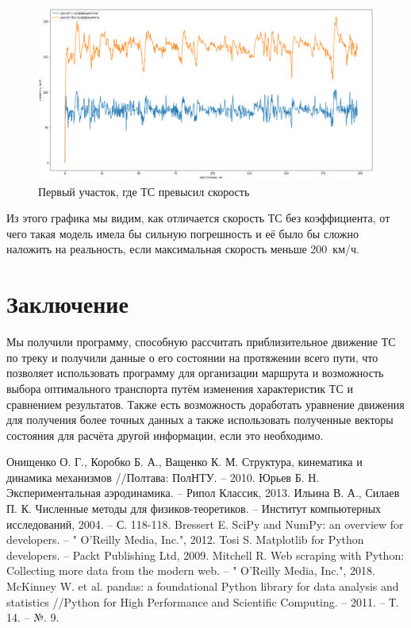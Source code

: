 \documentclass[A4paper,12pt]{article}
\theoremstyle{plain} %
\theoremstyle{definition} %
\theoremstyle{remark} %
\begin{document}
  \begin{figure}[h!]
     \centering
     \includegraphics[scale = 0.55]{Сравнение_скорости.png}
     \caption{Первый участок, где ТС превысил скорость}
 \end{figure}
 
 Из этого графика мы видим, как отличается скорость ТС без коэффициента, от чего такая модель имела бы сильную погрешность и её было бы сложно наложить на реальность, если максимальная скорость меньше 200~км/ч.
 \newpage
 \section*{Заключение}
 
 Мы получили программу, способную рассчитать приблизительное движение ТС по треку и получили данные о его состоянии на протяжении всего пути, что позволяет использовать программу для организации маршрута и возможность выбора оптимального транспорта путём изменения характеристик ТС и сравнением результатов. Также есть возможность доработать уравнение движения для получения более точных данных а также использовать полученные векторы состояния для расчёта другой информации, если это необходимо.
 \newpage
 \begin{thebibliography}{9}
 Онищенко О. Г., Коробко Б. А., Ващенко К. М. Структура, кинематика и динамика механизмов //Полтава: ПолНТУ. – 2010.
 Юрьев Б. Н. Экспериментальная аэродинамика. – Рипол Классик, 2013.
 Ильина В. А., Силаев П. К. Численные методы для физиков-теоретиков. – Институт компьютерных исследований, 2004. – С. 118-118.
 Bressert E. SciPy and NumPy: an overview for developers. – " O'Reilly Media, Inc.", 2012.
 Tosi S. Matplotlib for Python developers. – Packt Publishing Ltd, 2009.
 Mitchell R. Web scraping with Python: Collecting more data from the modern web. – " O'Reilly Media, Inc.", 2018.
 McKinney W. et al. pandas: a foundational Python library for data analysis and statistics //Python for High Performance and Scientific Computing. – 2011. – Т. 14. – №. 9.
 \end{thebibliography}
 
\end{document}
